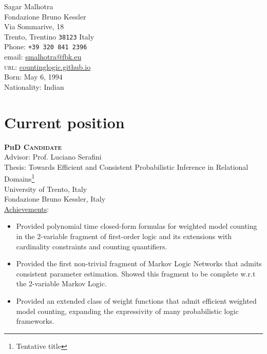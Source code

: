 \documentclass[10pt, a4paper]{article}
\newcommand{\years}[1]{\marginnote{\scriptsize #1}}
\begin{document}
{\LARGE Sagar Malhotra }\\[0.2cm]
 Fondazione Bruno Kessler\\
 Via Sommarive, 18\\
Trento, Trentino \texttt{38123}
Italy\\
Phone: \texttt{+39 320 841 2396}\\
email: \href{mailto:smalhotra@fbk.eu}{smalhotra@fbk.eu}\\
\textsc{url}: \href{https://countinglogic.github.io}{countinglogic.github.io}\\
Born:  May 6, 1994\\
Nationality:  Indian

\section*{Current position}
\noindent
\years{11.2019-01.2023}\textsc{\textbf{PhD Candidate}}\\
Advisor: Prof. Luciano Serafini\\
Thesis: Towards Efficient and Consistent Probabilistic Inference in Relational Domains\footnote{Tentative title}\\
University of Trento, Italy\\
Fondazione Bruno Kessler, Italy\\
\underline{Achievements}:
\begin{itemize}
    \item Provided polynomial time closed-form formulas for weighted model counting in the 2-variable fragment of first-order logic and its extensions with cardinality constraints and counting quantifiers.
    \item Provided the first non-trivial fragment of Markov Logic Networks that admits consistent parameter estimation. Showed this fragment to be complete w.r.t the 2-variable Markov Logic.
    \item Provided an extended class of weight functions that admit efficient weighted model counting, expanding the expressivity of many probabilistic logic frameworks.
\end{itemize}
\end{document}
